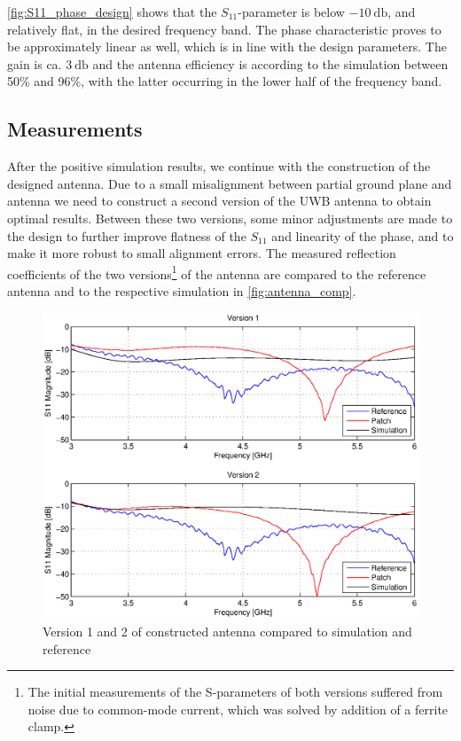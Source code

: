 \documentclass[a4paper]{article}        %
\begin{document}
		\autoref{fig:S11_phase_design} shows that the $S_{11}$-parameter is below $\SI{-10}{\decibel}$, and relatively flat, in the desired frequency band. The phase characteristic proves to be approximately linear as well, which is in line with the design parameters. The gain is ca. $\SI{3}{\decibel}$ and the antenna efficiency is according to the simulation between 50\% and 96\%, with the latter occurring in the lower half of the frequency band. 

	\subsection{Measurements}
		After the positive simulation results, we continue with the construction of the designed antenna. Due to a small misalignment between partial ground plane and antenna we need to construct a second version of the UWB antenna to obtain optimal results. Between these two versions, some minor adjustments are made to the design to further improve flatness of the $S_{11}$ and linearity of the phase, and to make it more robust to small alignment errors. The measured reflection coefficients of the two versions\footnote{The initial measurements of the S-parameters of both versions suffered from noise due to common-mode current, which was solved by addition of a ferrite clamp.} of the antenna are compared to the reference antenna and to the respective simulation in \autoref{fig:antenna_comp}. 

		\begin{figure}[H]
			\centering
			\includegraphics[width=\textwidth]{images/antenna/antenna_comparison.eps}
			\caption{Version 1 and 2 of constructed antenna compared to simulation and reference}
			\label{fig:antenna_comp}
		\end{figure}
\end{document}
